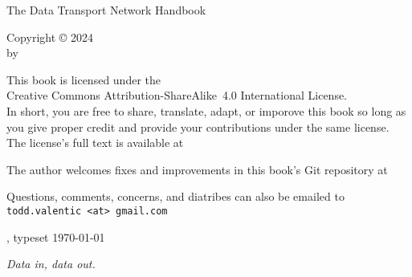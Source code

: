 \fontsize{11bp}{13bp}\selectfont

\frontmatter
\setcounter{secnumdepth}{0}
\setlength\parindent{0pt}


\vspace*{1in}
\begin{center}
\fontsize{0.5in}{0.7in}\selectfont
The Data Transport Network Handbook

\normalsize
\vspace{1.5\baselineskip}
\edition
\vspace{2in}

\LARGE
\runauthor
\end{center}
\clearpage


{\raggedright
\null
\vfill
{
Copyright \copyright{} 2024 \\
by \runauthor
\bigskip

This book is licensed under the \\
Creative Commons Attribution-ShareAlike~4.0 International License. \\
In short, you are free to share, translate, adapt, or imporove this book
so long as you give proper credit and provide your contributions under
the same license. \\
The license's full text is available at \\
}
\vfill

The author welcomes fixes and improvements in this book's Git repository at \\

\vspace{\baselineskip}
Questions, comments, concerns, and diatribes can also be emailed to \\
\texttt{todd.valentic <at> gmail.com}

\vspace{0.5in}
\edition, typeset \today
} %

\clearpage


\vspace*{1in}
{\itshape%
Data in, data out. 
}
\cleardoublepage


\tableofcontents

